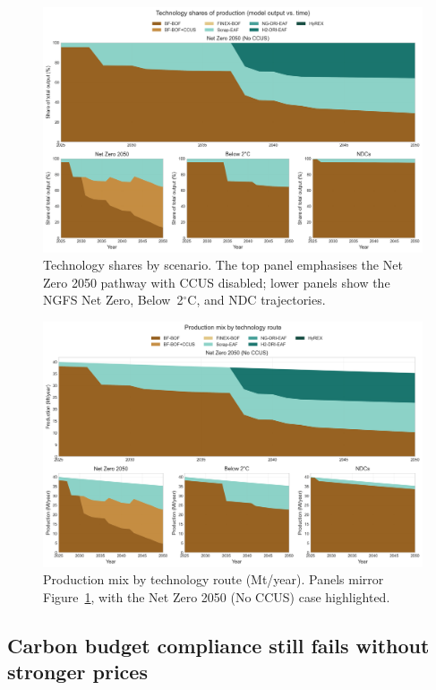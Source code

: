 \documentclass[preprint,1p,authoryear]{elsarticle}
\begin{document}
\begin{figure}[!t]
  \centering
  \includegraphics[width=0.8\linewidth]{technology_transition}
  \caption{Technology shares by scenario. The top panel emphasises the Net Zero 2050 pathway with CCUS disabled; lower panels show the NGFS Net Zero, Below~2$^\circ$C, and NDC trajectories.}
  \label{fig:technology-transition}
\end{figure}

\begin{figure}[!t]
  \centering
  \includegraphics[width=0.8\linewidth]{production_mix_evolution}
  \caption{Production mix by technology route (Mt/year). Panels mirror Figure~\ref{fig:technology-transition}, with the Net Zero 2050 (No CCUS) case highlighted.}
  \label{fig:production-mix}
\end{figure}

\subsection{Carbon budget compliance still fails without stronger prices}
\end{document}
